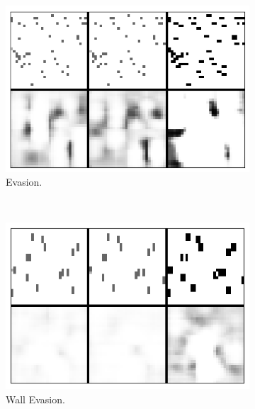 \begin{figure}[t!]
	\centering
	\begin{subfigure}{0.3\columnwidth}
		\centering
		\includegraphics[width=\linewidth]{documentation/report/img/cerb_scroll_evasion.png}
		\caption{Evasion.}
		\label{subfig:cerberus_scroll_race}
	\end{subfigure}%
	~ 
	\begin{subfigure}{0.3\columnwidth}
		\centering
		\includegraphics[width=\linewidth]{documentation/report/img/cerb_scroll_walls.png}
		\caption{Wall Evasion.}
		\label{subfig:cerberus_scroll_walls}
	\end{subfigure}
	~ 
	\begin{subfigure}{0.3\columnwidth}
		\centering

\end{subfigure}
\end{figure}
